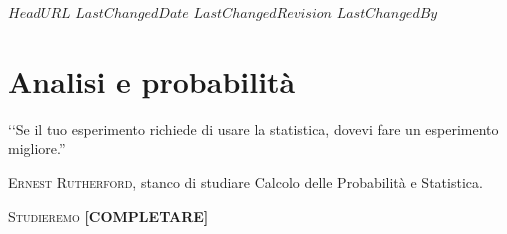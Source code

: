 \svnidlong
{$HeadURL$}
{$LastChangedDate$}
{$LastChangedRevision$}
{$LastChangedBy$}

\chapter{Analisi e probabilità}

\begin{introduction}
	‘‘Se il tuo esperimento richiede di usare la statistica, dovevi fare un esperimento migliore.''
	\begin{flushright}
		\textsc{Ernest Rutherford,} stanco di studiare Calcolo delle Probabilità e Statistica.
	\end{flushright}
\end{introduction}
\lettrine[findent=1pt, nindent=0pt]{S}{tudieremo} \textbf{[COMPLETARE]}
